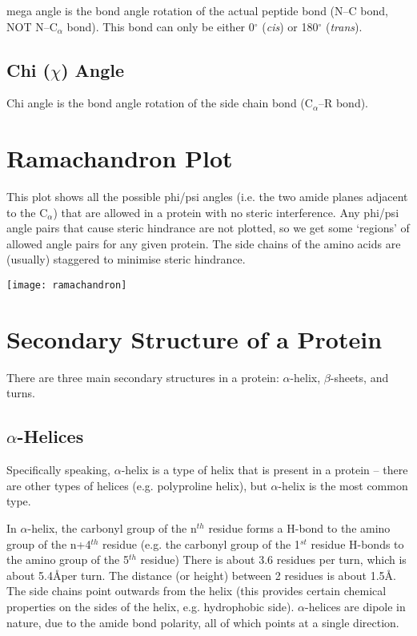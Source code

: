 mega angle is the bond angle rotation of the actual peptide bond (N--C bond, NOT N--C$_{\alpha}$ bond).
This bond can only be either 0$^{\circ}$ (\textit{cis}) or 180$^{\circ}$ (\textit{trans}).

\subsection{Chi ($\chi$) Angle}

Chi angle is the bond angle rotation of the side chain bond (C$_{\alpha}$--R bond).

\section{Ramachandron Plot}

This plot shows all the possible phi/psi angles (i.e. the two amide planes adjacent to the C$_{\alpha}$) that are allowed in a protein with no steric interference.
Any phi/psi angle pairs that cause steric hindrance are not plotted, so we get some `regions' of allowed angle pairs for any given protein.
The side chains of the amino acids are (usually) staggered to minimise steric hindrance.

\vspace{0.5cm}

\texttt{[image: ramachandron]}

\section{Secondary Structure of a Protein}

There are three main secondary structures in a protein: $\alpha$-helix, $\beta$-sheets, and turns.

\subsection{$\alpha$-Helices}

Specifically speaking, $\alpha$-helix is a type of helix that is present in a protein -- there are other types of helices (e.g. polyproline helix), but $\alpha$-helix is the most common type.

In $\alpha$-helix, the carbonyl group of the n$^{th}$ residue forms a H-bond to the amino group of the n+4$^{th}$ residue (e.g. the carbonyl group of the 1$^{st}$ residue H-bonds to the amino group of the 5$^{th}$ residue)
There is about 3.6 residues per turn, which is about 5.4\AA per turn.
The distance (or height) between 2 residues is about 1.5\AA.
The side chains point outwards from the helix (this provides certain chemical properties on the sides of the helix, e.g. hydrophobic side). 
$\alpha$-helices are dipole in nature, due to the amide bond polarity, all of which points at a single direction.


